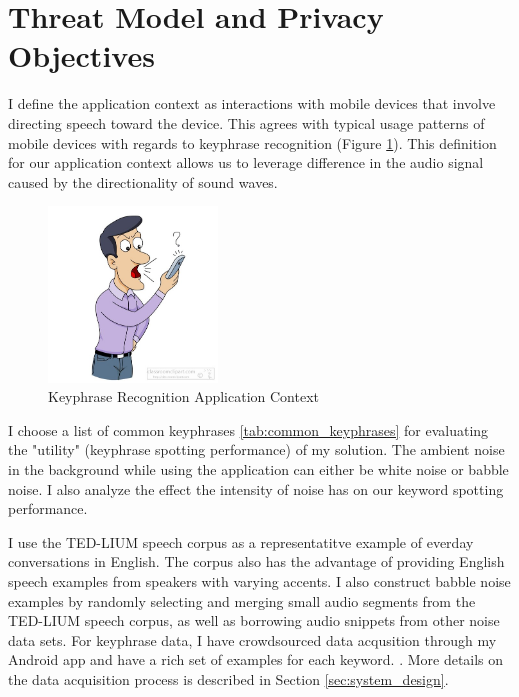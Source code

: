 
\section{Threat Model and Privacy Objectives}
\label{sec:threat_model}

I define the application context as interactions with mobile devices that involve directing speech toward the device.
 This agrees with typical usage patterns of mobile devices with regards to keyphrase recognition (Figure \ref{fig:keyphrase_application_context}).
 This definition for our application context allows us to leverage difference in the audio signal caused by the directionality of sound waves. 

\begin{figure}[!th]
\centering
\includegraphics[width=0.4\textwidth]{sound/talking-into-cell-phone.jpg}
\caption{Keyphrase Recognition Application Context}
\label{fig:keyphrase_application_context}
\end{figure}




I choose a list of common keyphrases \ref{tab:common_keyphrases} for evaluating the "utility" (keyphrase spotting performance) of my solution.
 The ambient noise in the background while using the application can either be white noise or babble noise.
 I also analyze the effect the intensity of noise has on our keyword spotting performance.

I use the TED-LIUM speech corpus \cite{TEDLIUMCorpus} as a representatitve example of everday conversations in English.
 The corpus also has the advantage of providing English speech examples from speakers with varying accents.
 I also construct babble noise examples by randomly selecting and merging small audio segments from the TED-LIUM speech corpus, as well as borrowing audio snippets from other noise data sets.
 For keyphrase data, I have crowdsourced data acqusition through my Android app and have a rich set of examples for each keyword.
 .
 More details on the data acquisition process is described in Section \ref{sec:system_design}.



